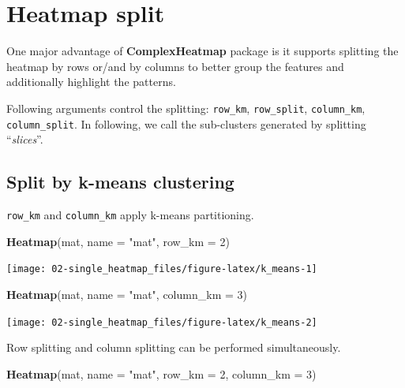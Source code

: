 \documentclass[]{book}
\newenvironment{Shaded}{\begin{snugshade}}{\end{snugshade}}
\newcommand{\KeywordTok}[1]{\textcolor[rgb]{0.13,0.29,0.53}{\textbf{#1}}}
\newcommand{\DataTypeTok}[1]{\textcolor[rgb]{0.13,0.29,0.53}{#1}}
\newcommand{\DecValTok}[1]{\textcolor[rgb]{0.00,0.00,0.81}{#1}}
\newcommand{\StringTok}[1]{\textcolor[rgb]{0.31,0.60,0.02}{#1}}
\newcommand{\NormalTok}[1]{#1}
\theoremstyle{definition}
\theoremstyle{definition}
\theoremstyle{definition}
\theoremstyle{remark}
\begin{document}
\section{Heatmap split}\label{heatmap-split}

One major advantage of \textbf{ComplexHeatmap} package is it supports
splitting the heatmap by rows or/and by columns to better group the
features and additionally highlight the patterns.

Following arguments control the splitting: \texttt{row\_km},
\texttt{row\_split}, \texttt{column\_km}, \texttt{column\_split}. In
following, we call the sub-clusters generated by splitting
``\emph{slices}''.

\subsection{Split by k-means
clustering}\label{split-by-kmeans-clustering}

\texttt{row\_km} and \texttt{column\_km} apply k-means partitioning.

\begin{Shaded}
\begin{Highlighting}[]
\KeywordTok{Heatmap}\NormalTok{(mat, }\DataTypeTok{name =} \StringTok{"mat"}\NormalTok{, }\DataTypeTok{row_km =} \DecValTok{2}\NormalTok{)}
\end{Highlighting}
\end{Shaded}

\begin{center}\texttt{[image: 02-single\_heatmap\_files/figure-latex/k\_means-1]} \end{center}

\begin{Shaded}
\begin{Highlighting}[]
\KeywordTok{Heatmap}\NormalTok{(mat, }\DataTypeTok{name =} \StringTok{"mat"}\NormalTok{, }\DataTypeTok{column_km =} \DecValTok{3}\NormalTok{)}
\end{Highlighting}
\end{Shaded}

\begin{center}\texttt{[image: 02-single\_heatmap\_files/figure-latex/k\_means-2]} \end{center}

Row splitting and column splitting can be performed simultaneously.

\begin{Shaded}
\begin{Highlighting}[]
\KeywordTok{Heatmap}\NormalTok{(mat, }\DataTypeTok{name =} \StringTok{"mat"}\NormalTok{, }\DataTypeTok{row_km =} \DecValTok{2}\NormalTok{, }\DataTypeTok{column_km =} \DecValTok{3}\NormalTok{)}
\end{Highlighting}
\end{Shaded}
\end{document}
